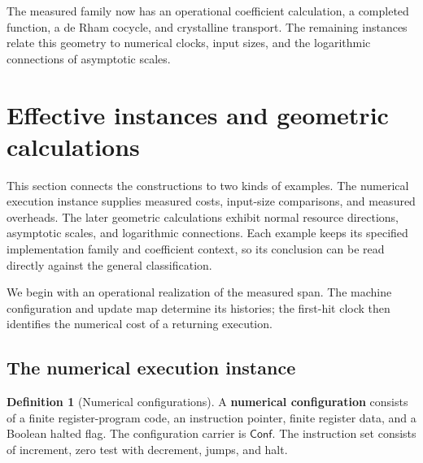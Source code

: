 \documentclass[11pt,a4paper]{article}
\numberwithin{algorithm}{section}
\numberwithin{equation}{section}
\theoremstyle{definition}
\newtheorem{definition}[definition]{Definition}
\theoremstyle{remark}
\theoremstyle{plain}
\theoremstyle{definition}
\theoremstyle{plain}
\begin{document}
The measured family now has an operational coefficient calculation, a
completed function, a de Rham cocycle, and crystalline transport. The
remaining instances relate this geometry to numerical clocks, input
sizes, and the logarithmic connections of asymptotic scales.

\section{Effective instances and geometric calculations}
\label{sec:instances}
\label{sec:recovery}

This section connects the constructions to two kinds of examples.
The numerical execution instance supplies measured costs, input-size
comparisons, and measured overheads. The later geometric
calculations exhibit normal resource directions, asymptotic scales,
and logarithmic connections. Each example keeps its specified
implementation family and coefficient context, so its conclusion
can be read directly against the general classification.

We begin with an operational realization of the measured span.
The machine configuration and update map determine its histories;
the first-hit clock then identifies the numerical cost of a
returning execution.

\subsection{The numerical execution instance}
\begin{definition}[Numerical configurations]\label{def:numerical-configurations}
A \textbf{numerical configuration} consists of a finite
register-program code, an instruction pointer, finite register data,
and a Boolean halted flag. The configuration carrier is
$\mathsf{Conf}$. The instruction set consists of increment, zero
test with decrement, jumps, and halt.
\end{definition}
\end{document}
